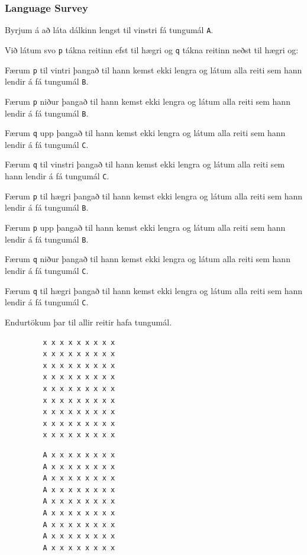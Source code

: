 {
	\frametitle{Language Survey}
	{
		\item<1-> Byrjum á að láta dálkinn lengst til vinstri fá tungumál \texttt{A}.
		\item<2-> Við látum svo \texttt{p} tákna reitinn efst til hægri og \texttt{q} tákna reitinn neðst til hægri og:
		{
			\item<3-> Færum \texttt{p} til vintri þangað til hann kemst ekki lengra og látum alla reiti sem hann lendir á fá tungumál \texttt{B}.
			\item<4-> Færum \texttt{p} niður þangað til hann kemst ekki lengra og látum alla reiti sem hann lendir á fá tungumál \texttt{B}.
			\item<5-> Færum \texttt{q} upp þangað til hann kemst ekki lengra og látum alla reiti sem hann lendir á fá tungumál \texttt{C}.
			\item<6-> Færum \texttt{q} til vinstri þangað til hann kemst ekki lengra og látum alla reiti sem hann lendir á fá tungumál \texttt{C}.
			\item<7-> Færum \texttt{p} til hægri þangað til hann kemst ekki lengra og látum alla reiti sem hann lendir á fá tungumál \texttt{B}.
			\item<8-> Færum \texttt{p} upp þangað til hann kemst ekki lengra og látum alla reiti sem hann lendir á fá tungumál \texttt{B}.
			\item<9-> Færum \texttt{q} niður þangað til hann kemst ekki lengra og látum alla reiti sem hann lendir á fá tungumál \texttt{C}.
			\item<10-> Færum \texttt{q} til hægri þangað til hann kemst ekki lengra og látum alla reiti sem hann lendir á fá tungumál \texttt{C}.
			\item<11-> Endurtökum þar til allir reitir hafa tungumál.
		}
	}
}

{ \begin{verbatim}
         x x x x x x x x x
         x x x x x x x x x
         x x x x x x x x x
         x x x x x x x x x
         x x x x x x x x x
         x x x x x x x x x
         x x x x x x x x x
         x x x x x x x x x
         x x x x x x x x x
\end{verbatim} }

{ \begin{verbatim}
         A x x x x x x x x
         A x x x x x x x x
         A x x x x x x x x
         A x x x x x x x x
         A x x x x x x x x
         A x x x x x x x x
         A x x x x x x x x
         A x x x x x x x x
         A x x x x x x x x
\end{verbatim} }


